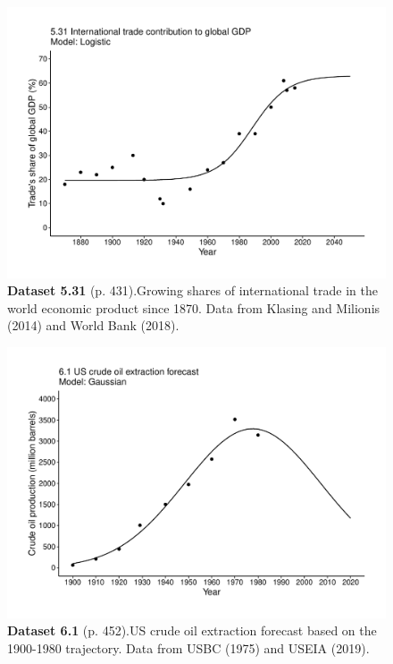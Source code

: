 \documentclass[aps,rmp,preprint,superscriptaddress,10pt,onecolumn]{article}
\begin{document}
\clearpage
\begin{figure}[h]
\includegraphics[width=\textwidth]{output/figs-ggplot/5.31.pdf}
\caption*{\textbf{Dataset 5.31} (p. 431).Growing shares of international trade in the world economic product since 1870. Data from Klasing and Milionis (2014) and World Bank (2018).}
\end{figure}
	
\clearpage
\begin{figure}[h]
\includegraphics[width=\textwidth]{output/figs-ggplot/6.1.pdf}
\caption*{\textbf{Dataset 6.1} (p. 452).US crude oil extraction forecast based on the 1900-1980 trajectory. Data from USBC (1975) and USEIA (2019). }
\end{figure}
	
\end{document}
